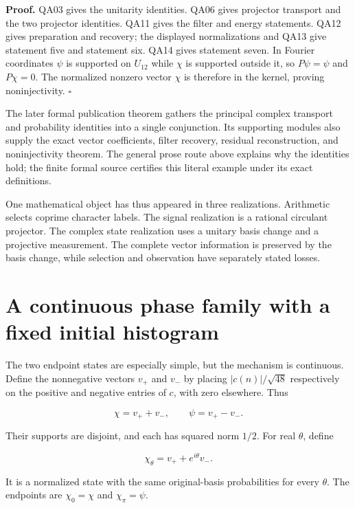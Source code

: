 \textbf{Proof.} QA03 gives the unitarity identities. QA06 gives
projector transport and the two projector identities. QA11 gives the
filter and energy statements. QA12 gives preparation and recovery; the
displayed normalizations and QA13 give statement five and statement six.
QA14 gives statement seven. In Fourier coordinates \(\psi\) is supported
on \(U_{12}\) while \(\chi\) is supported outside it, so \(P\psi=\psi\)
and \(P\chi=0\). The normalized nonzero vector \(\chi\) is therefore in
the kernel, proving noninjectivity. \(\square\)

The later formal publication theorem gathers the principal complex
transport and probability identities into a single conjunction. Its
supporting modules also supply the exact vector coefficients, filter
recovery, residual reconstruction, and noninjectivity theorem. The
general prose route above explains why the identities hold; the finite
formal source certifies this literal example under its exact
definitions.

One mathematical object has thus appeared in three realizations.
Arithmetic selects coprime character labels. The signal realization is a
rational circulant projector. The complex state realization uses a
unitary basis change and a projective measurement. The complete vector
information is preserved by the basis change, while selection and
observation have separately stated losses.

\hypertarget{q:a-continuous-phase-family-with-a-fixed-initial-histogram}{%
\section{A continuous phase family with a fixed initial
histogram}\label{q:a-continuous-phase-family-with-a-fixed-initial-histogram}}

The two endpoint states are especially simple, but the mechanism is
continuous. Define the nonnegative vectors \(v_+\) and \(v_-\) by
placing \(|c(n)|/\sqrt{48}\) respectively on the positive and negative
entries of \(c\), with zero elsewhere. Thus

\[
\chi=v_++v_-,
\qquad \psi=v_+-v_-.
\]

Their supports are disjoint, and each has squared norm \(1/2\). For real
\(\theta\), define

\[
\chi_\theta=v_++e^{i\theta}v_-.
\]

It is a normalized state with the same original-basis probabilities for
every \(\theta\). The endpoints are \(\chi_0=\chi\) and
\(\chi_\pi=\psi\).

